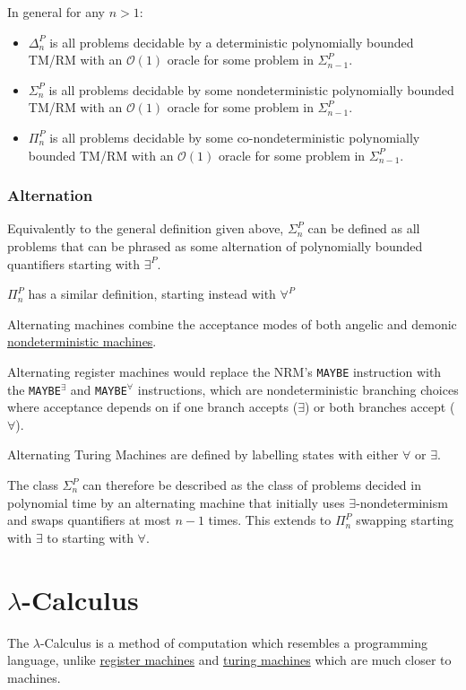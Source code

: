 \documentclass{article}
\begin{document}
In general for any $n>1$:
\begin{itemize}
    \item $\Delta_n^P$ is all problems decidable by a deterministic polynomially bounded TM/RM with an $\mathcal{O}(1)$ oracle for some problem in $\Sigma_{n-1}^P$.
    \item $\Sigma_n^P$ is all problems decidable by some nondeterministic polynomially bounded TM/RM with an $\mathcal{O}(1)$ oracle for some problem in $\Sigma_{n-1}^P$.
    \item $\Pi_n^P$ is all problems decidable by some co-nondeterministic polynomially bounded TM/RM with an $\mathcal{O}(1)$ oracle for some problem in $\Sigma_{n-1}^P$.
\end{itemize}

\subsubsection{Alternation}
Equivalently to the general definition given above, $\Sigma_n^P$ can be defined as all problems that can be phrased as some alternation of polynomially bounded quantifiers starting with $\exists^P$.

$\Pi_n^P$ has a similar definition, starting instead with $\forall^P$

Alternating machines combine the acceptance modes of both angelic and demonic \hyperref[nrm]{nondeterministic machines}.

Alternating register machines would replace the NRM's \texttt{MAYBE} instruction with the \texttt{MAYBE}$^\exists$ and \texttt{MAYBE}$^\forall$ instructions, which are nondeterministic branching choices where acceptance depends on if one branch accepts ($\exists$) or both branches accept ($\forall$).

Alternating Turing Machines are defined by labelling states
with either $\forall$ or $\exists$.

The class $\Sigma_n^P$ can therefore be described as the class of problems decided in polynomial time by an alternating machine that initially uses $\exists$-nondeterminism and swaps quantifiers at most $n-1$ times. This extends to $\Pi_n^P$ swapping starting with $\exists$ to starting with $\forall$.

\newpage

\section{$\lambda$-Calculus}\label{lambda-calculus}
The $\lambda$-Calculus is a method of computation which resembles a programming language, unlike \hyperref[rm]{register machines} and \hyperref[tm]{turing machines} which are much closer to machines.
\end{document}
